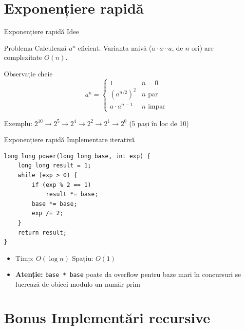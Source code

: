 \documentclass{beamer}
\begin{document}
\section{Exponențiere rapidă}

\begin{frame}{Exponențiere rapidă \textemdash{} Idee}
  \begin{block}{Problema}
    Calculează $a^n$ eficient. Varianta naivă ($a \cdot a \cdots a$, de $n$ ori) are complexitate $O(n)$.
  \end{block}
  \bigskip
  \begin{block}{Observație cheie}
    \[
      a^n = \begin{cases}
        1 & n = 0 \\
        \left(a^{n/2}\right)^2 & n \text{ par} \\
        a \cdot a^{n-1} & n \text{ impar}
      \end{cases}
    \]
  \end{block}
  \bigskip
  Exemplu: $2^{10} \rightarrow 2^5 \rightarrow 2^4 \rightarrow 2^2 \rightarrow 2^1 \rightarrow 2^0$ \quad (5 pași în loc de 10)
\end{frame}

\begin{frame}{Exponențiere rapidă \textemdash{} Implementare iterativă}
  \begin{center}
  \begin{lstlisting}
long long power(long long base, int exp) {
    long long result = 1;
    while (exp > 0) {
        if (exp % 2 == 1)
            result *= base;
        base *= base;
        exp /= 2;
    }
    return result;
}
  \end{lstlisting}
  \end{center}
  \begin{itemize}
    \item Timp: $O(\log n)$ \quad Spațiu: $O(1)$
    \item \textbf{Atenție:} \lstinline|base * base| poate da overflow pentru baze mari \textemdash{} în concursuri se lucrează de obicei modulo un număr prim
  \end{itemize}
\end{frame}

\section{Bonus \textemdash{} Implementări recursive}
\end{document}
